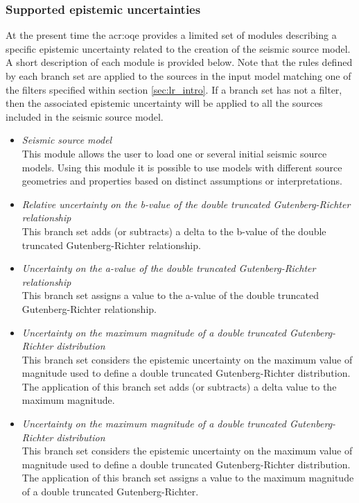 \subsubsection{Supported epistemic uncertainties}
At the present time the \gls{acr:oqe} provides a limited set of modules 
describing a specific epistemic uncertainty related to the creation of 
the seismic source model.
%
A short description of each module is provided below. Note that 
the rules defined by each branch set are applied to the sources 
in the input model matching one of the filters specified within
section \ref{sec:lr_intro}. 
%
If a branch set has not a filter, then the associated epistemic 
uncertainty will be applied to all the sources included in the 
seismic source model.
%
\begin{itemize}
    \item \emph{Seismic source model} \hfill \\
        This module allows the user to load one or several initial seismic 
        source models. Using this module it is possible to use models
        with different source geometries and properties based on distinct 
        assumptions or interpretations.
    \item \emph{Relative uncertainty on the b-value of the double truncated 
        Gutenberg-Richter relationship} \hfill \\
        This branch set adds (or subtracts) a delta to the b-value of the 
        double truncated Gutenberg-Richter relationship.
    \item \emph{Uncertainty on the a-value of the double 
        truncated Gutenberg-Richter relationship} \hfill \\ 
        This branch set assigns a value to the a-value of the double truncated 
        Gutenberg-Richter relationship.
    \item \emph{Uncertainty on the maximum magnitude of a double 
        truncated Gutenberg-Richter distribution} \hfill \\ 
        This branch set considers the epistemic uncertainty on the maximum 
        value of magnitude used to define a double truncated Gutenberg-Richter 
        distribution. The application of this branch set adds 
        (or subtracts) a delta value to the maximum magnitude.
   \item \emph{Uncertainty on the maximum magnitude of a double 
        truncated Gutenberg-Richter distribution} \hfill \\ 
        This branch set considers the epistemic uncertainty on the maximum 
        value of magnitude used to define a double truncated Gutenberg-Richter 
        distribution. The application of this branch set  
        assigns a value to the maximum magnitude of a double truncated 
        Gutenberg-Richter.
\end{itemize}
